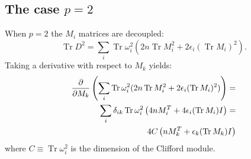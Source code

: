 \documentclass[12pt,a4paper]{article}
\DeclareMathOperator{\Tr}{Tr}
\begin{document}
\subsection{The case $p=2$}
When $p = 2$ the $M_i$ matrices are decoupled:
\begin{equation}
\Tr D^2 = \sum_i \Tr \omega_i^2 (2 n \Tr M_i^2 + 2 \epsilon_i (\Tr M_i)^2).
\end{equation} 
Taking a derivative with respect to $M_k$ yields:
\begin{align}
\frac{\partial}{\partial M_k} \left( \sum_i \Tr \omega_i^2 (2 n \Tr M_i^2 + 2 \epsilon_i (\Tr M_i)^2) \right) = \notag \\
\sum_i \delta_{ik} \Tr \omega_i^2 \left( 4 n M_i^T + 4 \epsilon_i (\Tr M_i) I \right) = \notag \\
4 C \left( n M_k^T + \epsilon_k (\Tr M_k) I \right)
\end{align}
where $C \equiv \Tr \omega_i^2$ is the dimension of the Clifford module.
\end{document}

